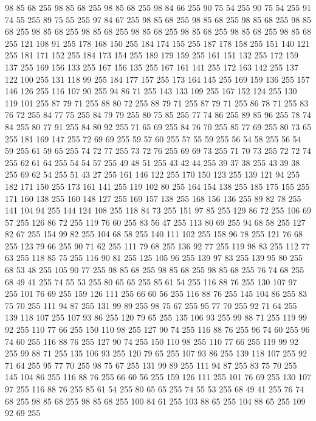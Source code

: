 98 85 68 255 98 85 68 255 98 85 68 255 98 84 66 255 90 75 54 255 90 75 54 255 91 74 55 255 89 75 55 255 97 84 67 255 98 85 68 255 98 85 68 255 98 85 68 255 98 85 68 255 98 85 68 255 98 85 68 255 98 85 68 255 98 85 68 255 98 85 68 255 98 85 68 255 121 108 91 255 178 168 150 255 184 174 155 255 187 178 158 255 151 140 121 255 181 171 152 255 184 173 154 255 189 179 159 255 161 151 132 255 172 159 137 255 169 156 133 255 167 156 135 255 167 161 141 255 172 163 142 255 137 122 100 255 131 118 99 255 184 177 157 255 173 164 145 255 169 159 136 255 157 146 126 255 116 107 90 255 94 86 71 255 143 133 109 255 167 152 124 255 130 119 101 255 87 79 71 255 88 80 72 255 88 79 71 255 87 79 71 255 86 78 71 255 83 76 72 255 84 77 75 255 84 79 79 255 80 75 85 255 77 74 86 255 89 85 96 255 78 74 84 255 80 77 91 255 84 80 92 255 71 65 69 255 84 76 70 255 85 77 69 255 80 73 65 255 181 169 147 255 72 69 69 255
59 57 60 255 57 55 59 255 56 54 58 255 56 54 59 255 61 59 65 255 74 72 77 255 73 72 76 255 69 69 73 255 71 70 73 255 72 72 74 255 62 61 64 255 54 54 57 255 49 48 51 255 43 42 44 255 39 37 38 255 43 39 38 255 69 62 54 255 51 43 27 255 161 146 122 255 170 150 123 255 139 121 94 255 182 171 150 255 173 161 141 255 119 102 80 255 164 154 138 255 185 175 155 255 171 160 138 255 160 148 127 255 169 157 138 255 168 156 136 255 89 82 78 255 141 104 94 255 144 124 108 255 118 84 73 255 151 97 85 255 129 86 72 255 106 69 57 255 126 86 72 255 119 76 60 255 83 56 47 255 113 80 69 255 94 68 58 255 127 82 67 255 154 99 82 255 104 68 58 255 140 111 102 255 158 96 78 255 121 76 68 255 123 79 66 255 90 71 62 255 111 79 68 255 136 92 77 255 119 98 83 255 112 77 63 255 118 85 75 255 116 90 81 255 125 105 96 255 139 97 83 255 139 95 80 255 68 53 48 255 105 90 77 255 98 85 68 255 98 85 68 255 98 85 68 255
76 74 68 255 68 49 41 255 74 55 53 255 80 65 65 255 85 61 54 255 116 88 76 255 130 107 97 255 101 76 69 255 159 126 111 255 66 60 56 255 116 88 76 255 145 104 86 255 83 75 70 255 111 94 87 255 131 99 89 255 98 75 67 255 95 77 70 255 92 71 64 255 139 118 107 255 107 93 86 255 120 79 65 255 135 106 93 255 99 88 71 255 119 99 92 255 110 77 66 255 150 110 98 255 127 90 74 255 116 88 76 255 96 74 60 255 96 74 60 255 116 88 76 255 127 90 74 255 150 110 98 255 110 77 66 255 119 99 92 255 99 88 71 255 135 106 93 255 120 79 65 255 107 93 86 255 139 118 107 255 92 71 64 255 95 77 70 255 98 75 67 255 131 99 89 255 111 94 87 255 83 75 70 255 145 104 86 255 116 88 76 255 66 60 56 255 159 126 111 255 101 76 69 255 130 107 97 255 116 88 76 255 85 61 54 255 80 65 65 255 74 55 53 255 68 49 41 255 76 74 68 255 98 85 68 255 98 85 68 255 100 84 61 255 103 88 65 255 104 88 65 255 109 92 69 255
